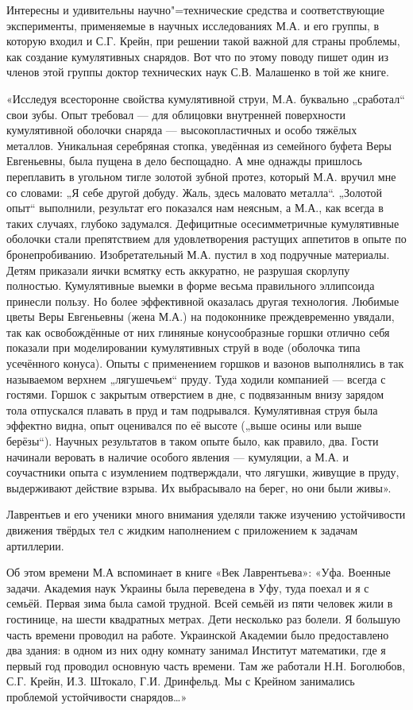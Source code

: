 Интересны и удивительны научно"=технические средства и соответствующие эксперименты, применяемые в научных исследованиях М.А. и его группы, в которую входил и С.Г.  Крейн, при решении такой важной для страны проблемы, как создание кумулятивных снарядов.  Вот что по этому поводу пишет один из членов этой группы доктор технических наук С.В. Малашенко в той же книге.

«Исследуя всесторонне свойства кумулятивной струи, М.А. буквально „сработал“ свои зубы. Опыт требовал — для облицовки внутренней поверхности кумулятивной оболочки снаряда — высокопластичных и особо тяжёлых металлов. Уникальная серебряная стопка, уведённая из семейного буфета Веры Евгеньевны, была пущена в дело беспощадно. А мне однажды пришлось переплавить в угольном тигле золотой зубной протез, который М.А. вручил мне со словами: „Я себе другой добуду. Жаль, здесь маловато металла“. „Золотой опыт“ выполнили, результат его показался нам неясным, а М.А., как всегда в таких случаях, глубоко задумался. Дефицитные осесимметричные кумулятивные оболочки стали препятствием для удовлетворения растущих аппетитов в опыте по бронепробиванию. Изобретательный М.А. пустил в ход подручные материалы. Детям приказали яички всмятку есть аккуратно, не разрушая скорлупу полностью. Кумулятивные выемки в форме весьма правильного эллипсоида принесли пользу. Но более эффективной оказалась другая технология. Любимые цветы Веры Евгеньевны (жена М.А.) на подоконнике преждевременно увядали, так как освобождённые от них глиняные конусообразные горшки отлично себя показали при моделировании кумулятивных струй в воде (оболочка типа усечённого конуса). Опыты с применением горшков и вазонов выполнялись в так называемом верхнем „лягушечьем“ пруду. Туда ходили компанией — всегда с гостями. Горшок с закрытым отверстием в дне, с подвязанным внизу зарядом тола отпускался плавать в пруд и там подрывался. Кумулятивная струя была эффектно видна, опыт оценивался по её высоте („выше осины или выше берёзы“). Научных результатов в таком опыте было, как правило, два. Гости начинали веровать в наличие особого явления — кумуляции, а М.А. и соучастники опыта с изумлением подтверждали, что лягушки, живущие в пруду, выдерживают действие взрыва. Их выбрасывало на берег, но они были живы».

Лаврентьев и его ученики много внимания уделяли также изучению устойчивости движения твёрдых тел с жидким наполнением с приложением к задачам артиллерии.

Об этом времени М.А вспоминает в книге «Век Лаврентьева»: «Уфа. Военные задачи. Академия наук Украины была переведена в Уфу, туда поехал и я с семьёй. Первая зима была самой трудной. Всей семьёй из пяти человек жили в гостинице, на шести квадратных метрах. Дети несколько раз болели. Я большую часть времени проводил на работе. Украинской Академии было предоставлено два здания: в одном из них одну комнату занимал Институт математики, где я первый год проводил основную часть времени. Там же работали Н.Н. Боголюбов, С.Г. Крейн, И.З. Штокало, Г.И. Дринфельд. Мы с Крейном занимались проблемой устойчивости снарядов…»


